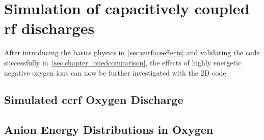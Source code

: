 %
\chapter{Simulation of capacitively coupled rf discharges}\label{sec:chapter_twodccrf}
%
	After introducing the basics physics in~\autoref{sec:surfaceeffects} and validating the code successfully in~\autoref{sec:chapter_onedcomparison}, the effects of highly energetic negative oxygen ions can now be further investigated with the 2D code.
%
	\section{Simulated ccrf Oxygen Discharge}\label{sec:twod_secondaryions}
%
%  
	\section{Anion Energy Distributions in Oxygen}\label{sec:twod_negionsdist}
%
